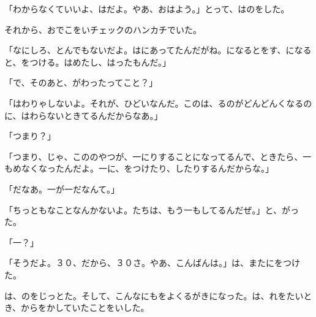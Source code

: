 「わからなくていいよ、はだよ。やあ、おはよう。」とって、はのをした。

それから、おでこをいチェックのハンカチでいた。

「なにしろ、とんでもないだよ。はにあってたんだがね。になるとをす、になると、をつける。はめたし、はったもんだ。」

「で、そのあと、がわったってこと？」

「はわりゃしないよ。それが、ひどいなんだ。このは、るのがどんどんくなるのに、はわらないときてるんだからなあ。」

「つまり？」

「つまり、じゃ、こののやつが、一にりすることになってるんで、ときたら、一もめなくなったんだよ。一に、をつけたり、したりするんだからな。」

「だなあ。一が一だなんて。」

「ちっともなことなんかないよ。たちは、もう一もしてるんだぜ。」と、がった。

「一？」

「そうだよ。３０、だから、３０さ。やあ、こんばんは。」は、またにをつけた。

は、のをじっとた。そして、こんなにもをよくるがきになった。は、れをたいとき、からをかしていたことをいした。

